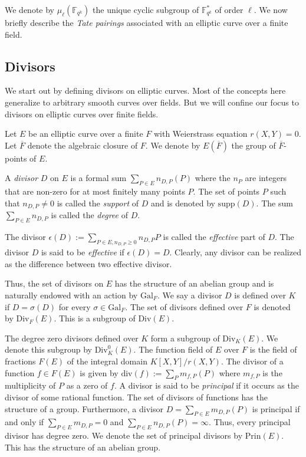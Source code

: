 \documentclass[11pt, lettersize, notitlepage, leqno, footskip=0.6cm]{article}
\newcommand{\bF}{\mathbb F}
\newcommand{\slim}{\sum\limits}
\newcommand{\absf}{\mathrm{Gal}_F}
\newcommand{\divv}{\mathrm{div}}
\newcommand{\mr}{\mathrm}
\newcommand{\ov}{\overline}
\numberwithin{equation}{section}
\begin{document}
We denote by $\mu_{\ell}(\bF _{q^k})$ the unique cyclic subgroup of $\bF _{q^k}^*$ of order $\ell$. We now briefly describe the \textit{Tate pairings} associated with an elliptic curve over a finite field.\\ 

\subsection{\fontsize{11}{11}\selectfont Divisors}

We start out by defining divisors on elliptic curves. Most of the concepts here generalize to arbitrary smooth curves over fields. But we will confine our focus to divisors on elliptic curves over finite fields.

Let $E$ be an elliptic curve over a finite $F$ with Weierstrass equation $r(X,Y) = 0$. Let $\ov{F}$ denote the algebraic closure of $F$. We denote by $E(\ov{F})$ the group of $\ov{F}$-points of $E$. 

A \textit{divisor} $D$ on $E$ is a formal sum $\slim_{P\in E}n_{D,P}(P) $ where the $n_P$ are integers that are non-zero for at most finitely many points $P$. The set of points $P$ such that $n_{D,P}\neq 0$ is called the \textit{support} of $D$ and is denoted by $\mr{supp}(D)$. The sum $\slim_{P\in E}n_{D,P}$ is called the \textit{degree} of $D$. 

The divisor $\epsilon(D):= \slim_{P\in E, n_{D,P}\geq 0} n_{D,P}P $ is called the \textit{effective} part of $D$. The divisor $D$ is said to be \textit{effective} if $\epsilon(D) = D$. Clearly, any divisor can be realized as the difference between two effective divisor.

Thus, the set of divisors on $E$ has the structure of an abelian group and is naturally endowed with an action by $\absf$. We say a divisor $D$ is defined over $K$ if $D = \sigma(D)$ for every $\sigma\in \absf$. The set of divisors defined over $F$ is denoted by $\mr{Div}_F(E)$. This is a subgroup of $\mr{Div}(E)$.

The degree zero divisors defined over $K$ form a subgroup of $\mr{Div}_K(E)$. We denote this subgroup by $\mr{Div}_K^0(E)$. The function field of $E$ over $F$ is the field of fractions $F(E)$ of the integral domain $K[X,Y]/r(X,Y).$ The divisor of a function $f\in F(E)$ is given by $\divv(f):= \slim_{P} m_{f,P}(P)$ where $m_{f,P}$ is the multiplicity of $P$ as a zero of $f$. A divisor is said to be \textit{principal} if it occurs as the divisor of some rational function. The set of divisors of functions has the structure of a group. Furthermore, a divisor $D= \slim_{P\in E}m_{D,P}(P)$ is principal if and only if $\slim_{P\in E}m_{D,P} = 0$ and $\slim_{P\in E}n_{D,P}(P) = \infty$. Thus, every principal divisor has degree zero. We denote the set of principal divisors by $\mr{Prin}(E)$. This has the structure of an abelian group.
\end{document}
